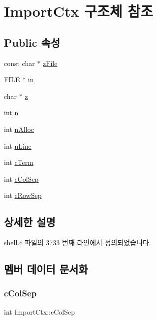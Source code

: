 \hypertarget{struct_import_ctx}{}\section{Import\+Ctx 구조체 참조}
\label{struct_import_ctx}
\subsection*{Public 속성}
\begin{DoxyCompactItemize}
\item 
const char $\ast$ \hyperlink{struct_import_ctx_a88414dab6838f62acc8dbb3d2afe299d}{z\+File}
\item 
F\+I\+LE $\ast$ \hyperlink{struct_import_ctx_a63c21cba47680ddd0c842866ab5486e5}{in}
\item 
char $\ast$ \hyperlink{struct_import_ctx_ade5d138b0f146f8bed3e83bfbb450f2e}{z}
\item 
int \hyperlink{struct_import_ctx_a93c89715a8ced4d28b9dcb29a083f748}{n}
\item 
int \hyperlink{struct_import_ctx_a04606938856e8071c34af5c68607734b}{n\+Alloc}
\item 
int \hyperlink{struct_import_ctx_a7b910b2b078d291e84ad333792efb000}{n\+Line}
\item 
int \hyperlink{struct_import_ctx_a32c66d4ff064ed9d5775ec6a0bab66ba}{c\+Term}
\item 
int \hyperlink{struct_import_ctx_a5c5dc07e3bd063d2da26da4a83f46576}{c\+Col\+Sep}
\item 
int \hyperlink{struct_import_ctx_a9b23999b41777a9726b91ec61b74f21a}{c\+Row\+Sep}
\end{DoxyCompactItemize}


\subsection{상세한 설명}


shell.\+c 파일의 3733 번째 라인에서 정의되었습니다.



\subsection{멤버 데이터 문서화}
\mbox{\label{struct_import_ctx_a5c5dc07e3bd063d2da26da4a83f46576}} 
\subsubsection{\texorpdfstring{c\+Col\+Sep}{cColSep}}
{\footnotesize\ttfamily int Import\+Ctx\+::c\+Col\+Sep}



